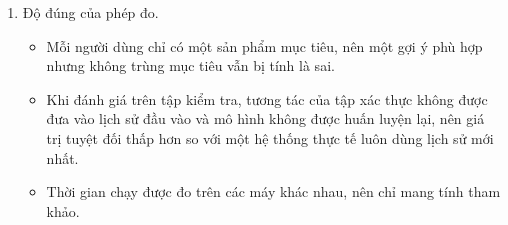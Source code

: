 \begin{enumerate}
\begin{itemize}
  \item Phần tổng quan tài liệu chỉ gồm các tài liệu nhóm đã đọc, không phải một tổng quan có hệ thống. Các phương pháp chỉ được nêu làm bối cảnh, gồm lọc cộng tác lân cận, SLIM, BSPM, Turbo-CF, PolyCF, FISM và Mult-VAE, không được chạy, nên chưa biết hai mô hình đề xuất đứng ở đâu so với chúng.
  \end{itemize}
\item Độ đúng của phép đo.
  \begin{itemize}
  \item Mỗi người dùng chỉ có một sản phẩm mục tiêu, nên một gợi ý phù hợp nhưng không trùng mục tiêu vẫn bị tính là sai.
  \item Khi đánh giá trên tập kiểm tra, tương tác của tập xác thực không được đưa vào lịch sử đầu vào và mô hình không được huấn luyện lại, nên giá trị tuyệt đối thấp hơn so với một hệ thống thực tế luôn dùng lịch sử mới nhất.
  \item Thời gian chạy được đo trên các máy khác nhau, nên chỉ mang tính tham khảo.
  \end{itemize}
\end{enumerate}
